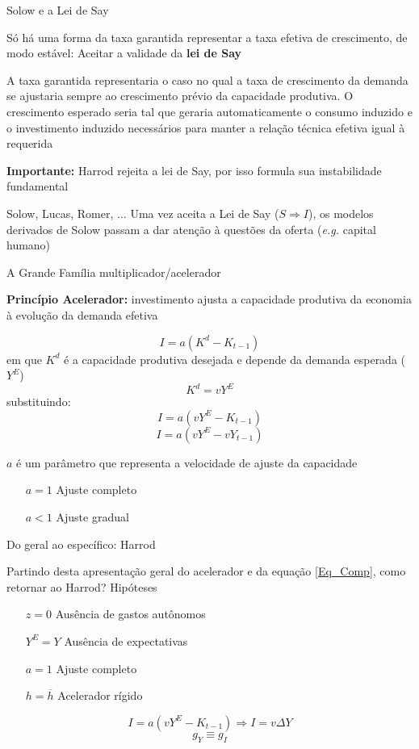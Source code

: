 \documentclass[10pt]{beamer}
\begin{document}
\begin{frame}{Solow e a Lei de Say}

Só há uma forma da taxa garantida representar a taxa efetiva de crescimento, de
modo estável: Aceitar a validade da \textbf{lei de Say}

A taxa garantida representaria o caso no qual a taxa de crescimento da demanda se
ajustaria sempre ao crescimento prévio da capacidade produtiva. O crescimento esperado seria tal que geraria automaticamente o consumo induzido e o
investimento induzido necessários para manter a relação técnica efetiva igual à requerida

\textbf{Importante:} Harrod rejeita a lei de Say, por isso formula sua instabilidade fundamental

\begin{alertblock}{Solow, Lucas, Romer, $\ldots$}
	Uma vez aceita a Lei de Say ($S \Rightarrow I$), os modelos derivados de Solow passam a dar atenção à questões da oferta (\textit{e.g.} capital humano)
\end{alertblock}

\end{frame}

\begin{frame}{A Grande Família multiplicador/acelerador}

\textbf{Princípio Acelerador:} investimento ajusta a capacidade produtiva da
economia à evolução da demanda efetiva

$$
I = a(K^d - K_{t-1})
$$
em que $K^d$ é a capacidade produtiva desejada e depende da demanda esperada ($Y^E$)
$$
K^d = vY^E
$$
substituindo:
$$
I = a(vY^E - K_{t-1})
$$
$$
I = a(vY^E - vY_{t-1})
$$

$a$ é um parâmetro que representa a velocidade de ajuste da capacidade
\begin{itemize}
	\item[$a=1$] Ajuste completo
	\item[$a<1$] Ajuste gradual
\end{itemize}
\end{frame}

\begin{frame}{Do geral ao específico: Harrod}

Partindo desta apresentação geral do acelerador e da equação \ref{Eq_Comp}, como retornar ao Harrod? Hipóteses

\begin{itemize}
	\item[$z=0$] Ausência de gastos autônomos
	\item[$Y^E=Y$] Ausência de expectativas
	\item[$a=1$] Ajuste completo
	\item[$h=\overline{h}$] Acelerador rígido
\end{itemize}

$$
I = a(vY^E - K_{t-1}) \Rightarrow I = v\Delta Y
$$
$$
g_Y \equiv g_I
$$

\end{frame}
\end{document}
